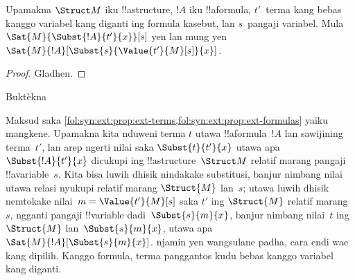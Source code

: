 \documentclass[../../../include/open-logic-section]{subfiles}
\begin{document}
\begin{prop}
Upamakna $\Struct M$ iku !!a{structure},
$!A$ iku !!a{formula}, $t'$~terma kang bebas kanggo variabel kang diganti ing formula kasebut, lan $s$~pangaji
variabel. Mula $\Sat{M}{\Subst{!A}{t'}{x}}[s]$
yen lan mung yen
$\Sat{M}{!A}[\Subst{s}{\Value{t'}{M}[s]}{x}]$.
\end{prop}

\begin{proof}
Gladhen.
\end{proof}

\begin{prob}
Buktèkna 
\end{prob}

\begin{explain}
  Maksud saka
  \cref{fol:syn:ext:prop:ext-terms,fol:syn:ext:prop:ext-formulas}
  yaiku mangkene. Upamakna kita nduweni terma $t$ utawa
  !!a{formula}~$!A$ lan sawijining terma~$t'$, lan arep
  ngerti nilai saka $\Subst{t}{t'}{x}$ utawa apa
  $\Subst{!A}{t'}{x}$ dicukupi ing
  !!a{structure}~$\Struct M$ relatif marang pangaji
  !!a{variable}~$s$. Kita bisa luwih dhisik nindakake
  substitusi, banjur nimbang nilai utawa relasi nyukupi
  relatif marang $\Struct{M}$ lan~$s$; utawa luwih dhisik
  nemtokake nilai~$m = \Value{t'}{M}[s]$ saka $t'$ ing
  $\Struct{M}$ relatif marang~$s$, ngganti pangaji
  !!{variable} dadi~$\Subst{s}{m}{x}$, banjur nimbang
  nilai~$t$ ing $\Struct{M}$ lan~$\Subst{s}{m}{x}$,
  utawa apa $\Sat{M}{!A}[\Subst{s}{m}{x}]$.
  njamin yen wangsulane padha, cara endi wae kang dipilih. Kanggo formula, terma panggantos kudu bebas kanggo variabel kang diganti.
\end{explain}
\end{document}
